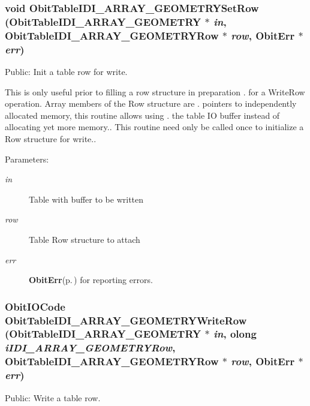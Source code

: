 \subsubsection{\setlength{\rightskip}{0pt plus 5cm}void Obit\-Table\-IDI\_\-ARRAY\_\-GEOMETRYSet\-Row ({\bf Obit\-Table\-IDI\_\-ARRAY\_\-GEOMETRY} $\ast$ {\em in}, {\bf Obit\-Table\-IDI\_\-ARRAY\_\-GEOMETRYRow} $\ast$ {\em row}, {\bf Obit\-Err} $\ast$ {\em err})}\label{ObitTableIDI__ARRAY__GEOMETRY_8c_a23}


Public: Init a table row for write. 

This is only useful prior to filling a row structure in preparation . for a Write\-Row operation. Array members of the Row structure are . pointers to independently allocated memory, this routine allows using . the table IO buffer instead of allocating yet more memory.. This routine need only be called once to initialize a Row structure for write.. \begin{Desc}
\item[Parameters:]
\begin{description}
\item[{\em in}]Table with buffer to be written \item[{\em row}]Table Row structure to attach \item[{\em err}]{\bf Obit\-Err}{\rm (p.\,\pageref{structObitErr})} for reporting errors. \end{description}
\end{Desc}
\subsubsection{\setlength{\rightskip}{0pt plus 5cm}Obit\-IOCode Obit\-Table\-IDI\_\-ARRAY\_\-GEOMETRYWrite\-Row ({\bf Obit\-Table\-IDI\_\-ARRAY\_\-GEOMETRY} $\ast$ {\em in}, {\bf olong} {\em i\-IDI\_\-ARRAY\_\-GEOMETRYRow}, {\bf Obit\-Table\-IDI\_\-ARRAY\_\-GEOMETRYRow} $\ast$ {\em row}, {\bf Obit\-Err} $\ast$ {\em err})}\label{ObitTableIDI__ARRAY__GEOMETRY_8c_a24}


Public: Write a table row. 

